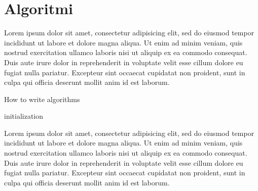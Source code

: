 \documentclass{article}
\begin{document}
\listofalgorithmes

\section{Algoritmi}

Lorem ipsum dolor sit amet, consectetur adipisicing elit, sed do eiusmod tempor incididunt ut labore et dolore magna aliqua. Ut enim ad minim veniam, quis nostrud exercitation ullamco laboris nisi ut aliquip ex ea commodo consequat. Duis aute irure dolor in reprehenderit in voluptate velit esse cillum dolore eu fugiat nulla pariatur. Excepteur sint occaecat cupidatat non proident, sunt in culpa qui officia deserunt mollit anim id est laborum.

\begin{algorithm2e}[H]
\caption{How to write algorithms}


\BlankLine
initialization 

\BlankLine
{}
\end{algorithm2e}

Lorem ipsum dolor sit amet, consectetur adipisicing elit, sed do eiusmod tempor incididunt ut labore et dolore magna aliqua. Ut enim ad minim veniam, quis nostrud exercitation ullamco laboris nisi ut aliquip ex ea commodo consequat. Duis aute irure dolor in reprehenderit in voluptate velit esse cillum dolore eu fugiat nulla pariatur. Excepteur sint occaecat cupidatat non proident, sunt in culpa qui officia deserunt mollit anim id est laborum.
\end{document}
